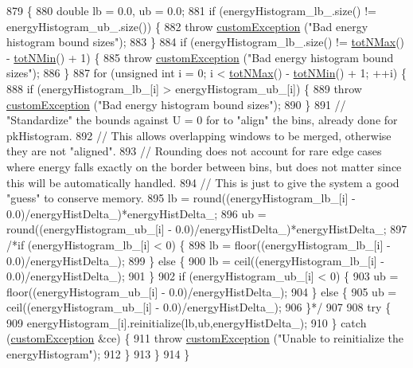 \begin{DoxyCode}
879                                              \{
880     \textcolor{keywordtype}{double} lb = 0.0, ub = 0.0;
881     \textcolor{keywordflow}{if} (energyHistogram\_lb\_.size() != energyHistogram\_ub\_.size()) \{
882         \textcolor{keywordflow}{throw} \hyperlink{classcustom_exception}{customException} (\textcolor{stringliteral}{"Bad energy histogram bound sizes"});
883     \}
884     \textcolor{keywordflow}{if} (energyHistogram\_lb\_.size() != \hyperlink{classsim_system_aee2c65ecb43a35c0c4d070cdb45f7dc0}{totNMax}() - \hyperlink{classsim_system_af10842e0eaa638373b8717c87b47e6bc}{totNMin}() + 1) \{
885         \textcolor{keywordflow}{throw} \hyperlink{classcustom_exception}{customException} (\textcolor{stringliteral}{"Bad energy histogram bound sizes"});
886     \}
887     \textcolor{keywordflow}{for} (\textcolor{keywordtype}{unsigned} \textcolor{keywordtype}{int} i = 0; i < \hyperlink{classsim_system_aee2c65ecb43a35c0c4d070cdb45f7dc0}{totNMax}() - \hyperlink{classsim_system_af10842e0eaa638373b8717c87b47e6bc}{totNMin}() + 1; ++i) \{
888         \textcolor{keywordflow}{if} (energyHistogram\_lb\_[i] > energyHistogram\_ub\_[i]) \{
889             \textcolor{keywordflow}{throw} \hyperlink{classcustom_exception}{customException} (\textcolor{stringliteral}{"Bad energy histogram bound sizes"});
890         \}
891         \textcolor{comment}{// "Standardize" the bounds against U = 0 for to "align" the bins, already done for pkHistogram.}
892         \textcolor{comment}{// This allows overlapping windows to be merged, otherwise they are not "aligned".}
893         \textcolor{comment}{// Rounding does not account for rare edge cases where energy falls exactly on the border between
       bins, but does not matter since this will be automatically handled.}
894         \textcolor{comment}{// This is just to give the system a good "guess" to conserve memory.}
895         lb = round((energyHistogram\_lb\_[i] - 0.0)/energyHistDelta\_)*energyHistDelta\_;
896         ub = round((energyHistogram\_ub\_[i] - 0.0)/energyHistDelta\_)*energyHistDelta\_;
897         \textcolor{comment}{/*if (energyHistogram\_lb\_[i] < 0) \{}
898 \textcolor{comment}{            lb = floor((energyHistogram\_lb\_[i] - 0.0)/energyHistDelta\_);}
899 \textcolor{comment}{        \} else \{}
900 \textcolor{comment}{            lb = ceil((energyHistogram\_lb\_[i] - 0.0)/energyHistDelta\_);}
901 \textcolor{comment}{        \}}
902 \textcolor{comment}{        if (energyHistogram\_ub\_[i] < 0) \{}
903 \textcolor{comment}{            ub = floor((energyHistogram\_ub\_[i] - 0.0)/energyHistDelta\_);}
904 \textcolor{comment}{        \} else \{}
905 \textcolor{comment}{            ub = ceil((energyHistogram\_ub\_[i] - 0.0)/energyHistDelta\_);}
906 \textcolor{comment}{        \}*/}
907 
908         \textcolor{keywordflow}{try} \{
909             energyHistogram\_[i].reinitialize(lb,ub,energyHistDelta\_);
910         \} \textcolor{keywordflow}{catch} (\hyperlink{classcustom_exception}{customException} &ce) \{
911             \textcolor{keywordflow}{throw} \hyperlink{classcustom_exception}{customException} (\textcolor{stringliteral}{"Unable to reinitialize the energyHistogram"});
912         \}
913     \}
914 \}
\end{DoxyCode}
